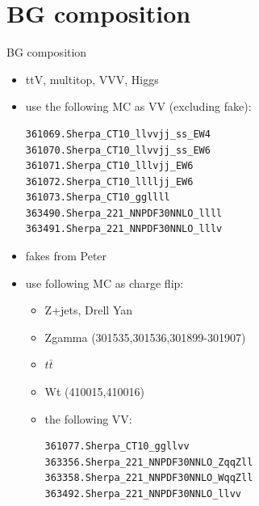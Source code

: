 \documentclass[mathserif,serif]{beamer}
\begin{document}
\section{BG composition}
\begin{frame}[fragile]{BG composition}
\small
\begin{itemize}
\item ttV, multitop, VVV, Higgs
\item use the following MC as VV (excluding fake):

\tiny
\begin{verbatim}
361069.Sherpa_CT10_llvvjj_ss_EW4
361070.Sherpa_CT10_llvvjj_ss_EW6
361071.Sherpa_CT10_lllvjj_EW6
361072.Sherpa_CT10_lllljj_EW6
361073.Sherpa_CT10_ggllll
363490.Sherpa_221_NNPDF30NNLO_llll
363491.Sherpa_221_NNPDF30NNLO_lllv
\end{verbatim}

\small
\item fakes from Peter
\item use following MC as charge flip:
\begin{itemize}
\item Z+jets, Drell Yan
\item Zgamma (301535,301536,301899-301907)
\item $t\bar{t}$
\item Wt (410015,410016)
\item the following VV:

\tiny
\begin{verbatim}
361077.Sherpa_CT10_ggllvv
363356.Sherpa_221_NNPDF30NNLO_ZqqZll
363358.Sherpa_221_NNPDF30NNLO_WqqZll
363492.Sherpa_221_NNPDF30NNLO_llvv
\end{verbatim}

\end{itemize}
\end{itemize}
\end{frame}
\end{document}
